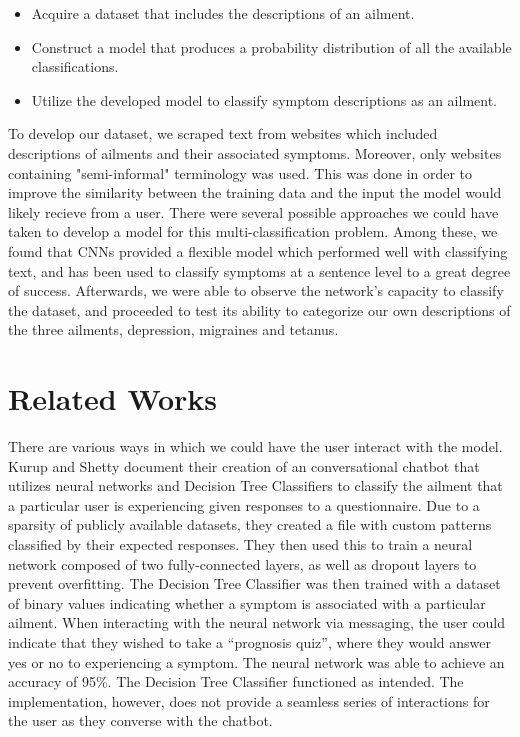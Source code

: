 \documentclass[12pt]{report}
\begin{document}
\begin{itemize}
	\item Acquire a dataset that includes the descriptions of an ailment.
	\item Construct a model that produces a probability distribution of all the available classifications.
	\item Utilize the developed model to classify symptom descriptions as an ailment.
\end{itemize}

To develop our dataset, we scraped text from websites which included
descriptions of ailments and their associated symptoms. Moreover, only websites
containing "semi-informal" terminology was used. This was done in order to
improve the similarity between the training data and the input the model would
likely recieve from a user. There were several possible approaches we could have
taken to develop a model for this multi-classification problem.
Among these, we found that CNNs
provided a flexible model which performed well with classifying text, and has been
used to classify symptoms at a sentence level to a great degree
of success\cite{HughesLKS17}. Afterwards, we were able to observe the network's capacity to classify
the dataset, and proceeded to test its ability to categorize our
own descriptions of the three ailments, depression, migraines and tetanus.

\chapter{Related Works}
There are various ways in which we could have the user interact with the
model. Kurup and Shetty document their creation of an conversational chatbot
that utilizes neural networks and Decision Tree Classifiers to classify the
ailment that a particular user is experiencing given responses to a
questionnaire. Due to a sparsity of publicly available
datasets, they created a file with custom patterns classified by their
expected responses. They then used this to train a neural network composed of two
fully-connected layers, as well as dropout layers to prevent overfitting. The Decision
Tree Classifier was then trained with a dataset of binary values indicating
whether a symptom is associated with a particular ailment. When
interacting with the neural network via messaging, the user could indicate
that they wished to take a “prognosis quiz”, where they would answer yes or
no to experiencing a symptom. The neural network was able to achieve
an accuracy of 95\%. The Decision Tree Classifier functioned as intended. The
implementation, however, does not provide a seamless series of interactions
for the user as they converse with the chatbot\cite{kurup_2021}.
\end{document}
